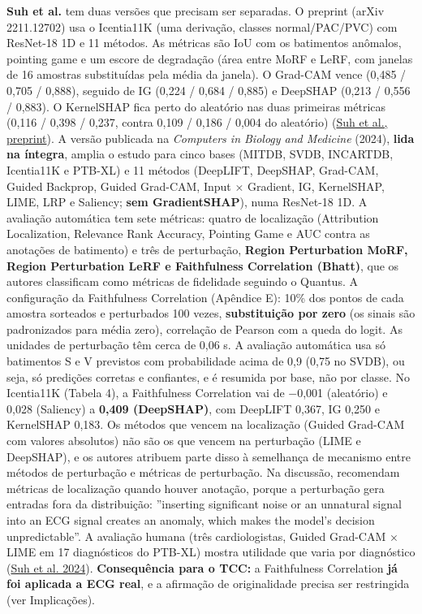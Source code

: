 \documentclass[11pt,a4paper]{article}
\begin{document}
\textbf{Suh et al.} tem duas versões que precisam ser separadas. O preprint (arXiv 2211.12702) usa o Icentia11K (uma derivação, classes normal/PAC/PVC) com ResNet-18 1D e 11 métodos. As métricas são IoU com os batimentos anômalos, pointing game e um escore de degradação (área entre MoRF e LeRF, com janelas de 16 amostras substituídas pela média da janela). O Grad-CAM vence (0,485 / 0,705 / 0,888), seguido de IG (0,224 / 0,684 / 0,885) e DeepSHAP (0,213 / 0,556 / 0,883). O KernelSHAP fica perto do aleatório nas duas primeiras métricas (0,116 / 0,398 / 0,237, contra 0,109 / 0,186 / 0,004 do aleatório) (\href{https://arxiv.org/html/2211.12702}{Suh et al., preprint}). A versão publicada na \textit{Computers in Biology and Medicine} (2024), \textbf{lida na íntegra}, amplia o estudo para cinco bases (MITDB, SVDB, INCARTDB, Icentia11K e PTB-XL) e 11 métodos (DeepLIFT, DeepSHAP, Grad-CAM, Guided Backprop, Guided Grad-CAM, Input × Gradient, IG, KernelSHAP, LIME, LRP e Saliency; \textbf{sem GradientSHAP}), numa ResNet-18 1D. A avaliação automática tem sete métricas: quatro de localização (Attribution Localization, Relevance Rank Accuracy, Pointing Game e AUC contra as anotações de batimento) e três de perturbação, \textbf{Region Perturbation MoRF, Region Perturbation LeRF e Faithfulness Correlation (Bhatt)}, que os autores classificam como métricas de fidelidade seguindo o Quantus. A configuração da Faithfulness Correlation (Apêndice E): 10\% dos pontos de cada amostra sorteados e perturbados 100 vezes, \textbf{substituição por zero} (os sinais são padronizados para média zero), correlação de Pearson com a queda do logit. As unidades de perturbação têm cerca de 0,06 s. A avaliação automática usa só batimentos S e V previstos com probabilidade acima de 0,9 (0,75 no SVDB), ou seja, só predições corretas e confiantes, e é resumida por base, não por classe. No Icentia11K (Tabela 4), a Faithfulness Correlation vai de −0,001 (aleatório) e 0,028 (Saliency) a \textbf{0,409 (DeepSHAP)}, com DeepLIFT 0,367, IG 0,250 e KernelSHAP 0,183. Os métodos que vencem na localização (Guided Grad-CAM com valores absolutos) não são os que vencem na perturbação (LIME e DeepSHAP), e os autores atribuem parte disso à semelhança de mecanismo entre métodos de perturbação e métricas de perturbação. Na discussão, recomendam métricas de localização quando houver anotação, porque a perturbação gera entradas fora da distribuição: ''inserting significant noise or an unnatural signal into an ECG signal creates an anomaly, which makes the model's decision unpredictable''. A avaliação humana (três cardiologistas, Guided Grad-CAM × LIME em 17 diagnósticos do PTB-XL) mostra utilidade que varia por diagnóstico (\href{https://doi.org/10.1016/j.compbiomed.2024.109088}{Suh et al. 2024}). \textbf{Consequência para o TCC:} a Faithfulness Correlation \textbf{já foi aplicada a ECG real}, e a afirmação de originalidade precisa ser restringida (ver Implicações).
\end{document}
